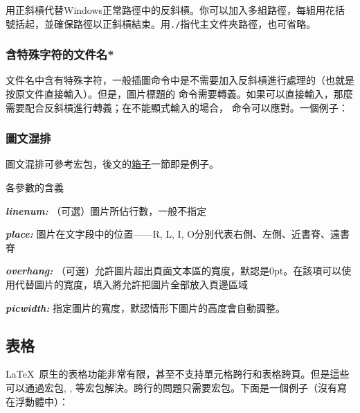 用正斜槓代替Windows正常路徑中的反斜槓。你可以加入多組路徑，每組用花括號括起，並確保路徑以正斜槓結束。用\verb|./|指代主文件夾路徑，也可省略。\dpar

\subsubsection{含特殊字符的文件名*}
文件名中含有特殊字符，一般插圖命令中是不需要加入反斜槓進行處理的（也就是按原文件直接輸入）。但是，圖片標題的  命令需要轉義。如果可以直接輸入，那麼需要配合反斜槓進行轉義；在不能顯式輸入的場合，  命令可以應對。一個例子：
\begin{latex}
\end{latex}

\subsubsection{圖文混排}
圖文混排可參考宏包，後文的\hyperref[sec:box]{箱子}一節即是例子。
\begin{latex}
\end{latex}

各參數的含義
\begin{inlinee}
\item {\bfseries\itshape linenum:} （可選）圖片所佔行數，一般不指定
\item {\bfseries\itshape place:} 圖片在文字段中的位置——R, L, I, O分別代表右側、左側、近書脊、遠書脊
\item {\bfseries\itshape overhang:} （可選）允許圖片超出頁面文本區的寬度，默認是0pt。在該項可以使用代替圖片的寬度，填入將允許把圖片全部放入頁邊區域
\item {\bfseries\itshape picwidth:} 指定圖片的寬度，默認情形下圖片的高度會自動調整。
\end{inlinee}

\subsection{表格}
\LaTeX\ 原生的表格功能非常有限，甚至不支持單元格跨行和表格跨頁。但是這些可以通過宏包, , 等宏包解決。跨行的問題只需要宏包。下面是一個例子（沒有寫在浮動體中）：

